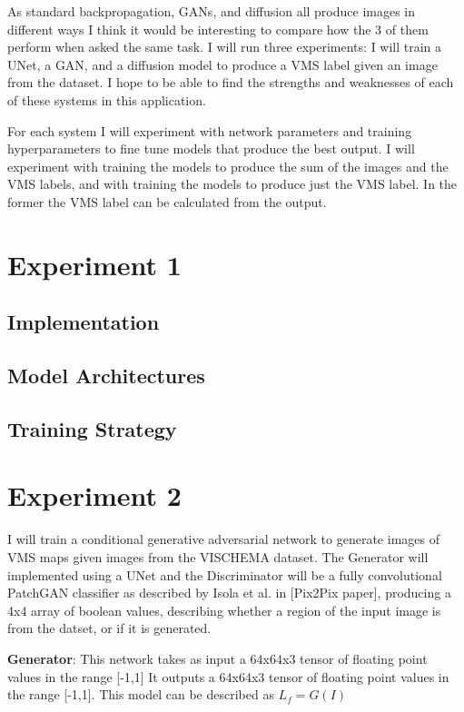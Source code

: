 \documentclass{UoYCSproject}
\begin{document}
As standard backpropagation, GANs, and diffusion all produce images in different ways I think it would be interesting to compare how the 3 of them perform when asked the same task. I will run three experiments: I will train a UNet, a GAN, and a diffusion model to produce a VMS label given an image from the dataset. I hope to be able to find the strengths and weaknesses of each of these systems in this application.

For each system I will experiment with network parameters and training hyperparameters to fine tune models that produce the best output. I will experiment with training the models to produce the sum of the images and the VMS labels, and with training the models to produce just the VMS label. In the former the VMS label can be calculated from the output. 


\section{Experiment 1}

\subsection{Implementation}
\subsection{Model Architectures}
\subsection{Training Strategy}

\section{Experiment 2}

I will train a conditional generative adversarial network to generate images of VMS maps given images from the VISCHEMA dataset. The Generator will implemented using a UNet and the Discriminator will be a fully convolutional PatchGAN classifier as described by Isola et al. in [Pix2Pix paper], producing a 4x4 array of boolean values, describing whether a region of the input image is from the datset, or if it is generated.

\textbf{Generator}: This network takes as input a 64x64x3 tensor of floating point values in the range [-1,1]
It outputs a 64x64x3 tensor of floating point values in the range [-1,1].
This model can be described as $ L_{f} = G(I) $
\end{document}
